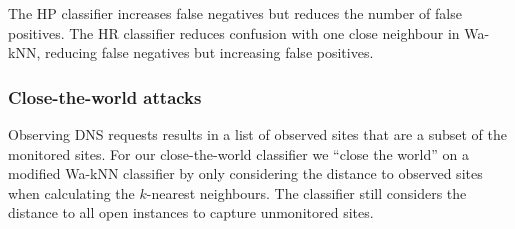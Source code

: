 The HP classifier increases false negatives but reduces the number of false
positives. The HR classifier reduces confusion with one close neighbour in
Wa-kNN, reducing false negatives but increasing false positives.

\subsubsection{Close-the-world attacks}
Observing DNS requests results in a list of observed sites that are a subset of
the monitored sites.
For our close-the-world classifier we ``close the world''
on a modified Wa-kNN classifier by only considering the distance to observed
sites when calculating the $k$-nearest neighbours. The classifier still
considers the distance to all open instances to capture unmonitored sites.
